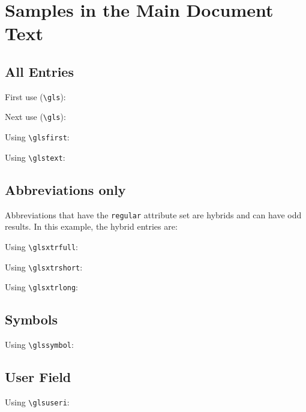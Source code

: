 \documentclass[fontsize=10pt,open=any]{scrbook}
\begin{document}
\tableofcontents

\chapter{Samples in the Main Document Text}

\section{All Entries}

First use (\verb|\gls|): 

Next use (\verb|\gls|): 

Using \verb|\glsfirst|: 

Using \verb|\glstext|: 

\section{Abbreviations only}
Abbreviations that have the \verb|regular| attribute set are
hybrids and can have odd results. In this example, the hybrid
entries are: 

Using \verb|\glsxtrfull|: 

Using \verb|\glsxtrshort|: 

Using \verb|\glsxtrlong|: 

\section{Symbols}

Using \verb|\glssymbol|:

\section{User Field}

Using \verb|\glsuseri|:
\end{document}

